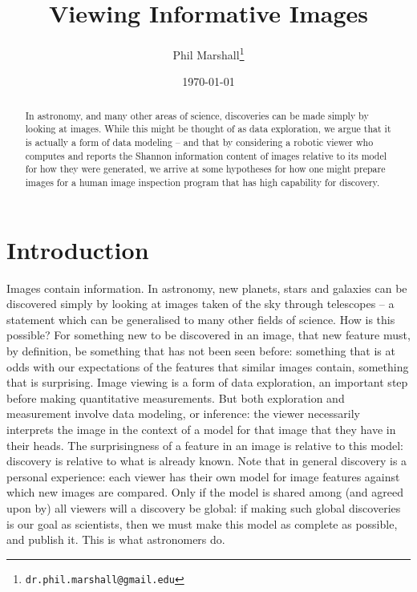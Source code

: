 \documentclass[letterpaper, 11pt]{article}
\title{Viewing Informative Images}
\author{Phil Marshall\thanks{\texttt{dr.phil.marshall@gmail.edu}}}
\date{\today}
\begin{document}
\maketitle

\begin{abstract} 

In astronomy, and many other areas of science, discoveries can be made simply
by looking at images. While this might be thought of as data exploration, we
argue that it is actually a form of data modeling -- and that  by considering
a robotic viewer who computes and reports the Shannon information content of
images relative to its model for how they were generated, we arrive at some
hypotheses for how one might prepare images for a human image inspection
program that has high capability for discovery.

\end{abstract}



\section{Introduction}

Images contain information. In astronomy, new planets, stars and galaxies can
be discovered simply by looking at images taken of the sky through telescopes
-- a statement which can be generalised to many other fields of science. How
is this possible? For something new to be discovered in an image, that new
feature must, by definition, be something that has not been seen before:
something that is at odds with our expectations of the features that similar 
images contain, something that is surprising. Image viewing is a form of data
exploration, an important step before making quantitative measurements. But
both exploration and measurement involve data modeling, or inference: the
viewer necessarily interprets the image in the context of a model for that
image that they have in their heads. The surprisingness of a feature in an
image is relative to this model: discovery is relative to what is already
known. Note that in general discovery is a personal experience: each viewer
has their own model for image features against which new images are compared.
Only if the model is shared among (and agreed upon by) all viewers will a
discovery be global: if making such global discoveries is our goal as
scientists, then we must make this model as complete as possible, and publish
it. This is what astronomers do.
\end{document}
